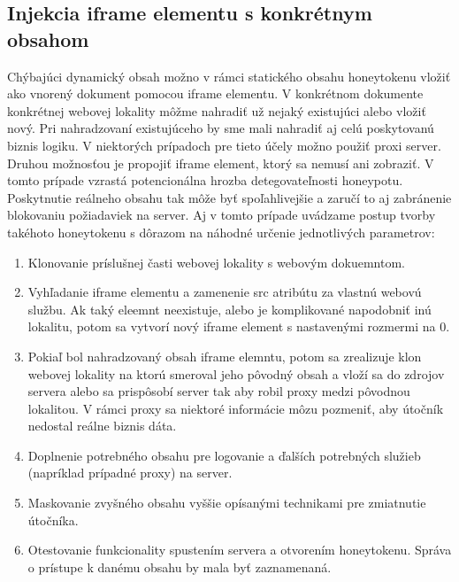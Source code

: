\documentclass[conference, 11pt,slovak,a4paper,twoside]{IEEEtran}
\begin{document}
\subsection{Injekcia iframe elementu s konkrétnym obsahom}

Chýbajúci dynamický obsah možno v rámci statického obsahu honeytokenu vložiť ako vnorený dokument pomocou iframe elementu. V konkrétnom dokumente konkrétnej webovej lokality môžme nahradiť už nejaký existujúci alebo vložiť nový. Pri nahradzovaní existujúceho by sme mali nahradiť aj celú poskytovanú biznis logiku. V niektorých prípadoch pre tieto účely možno použiť proxi server. Druhou možnosťou je propojiť iframe element, ktorý sa nemusí ani zobraziť. V tomto prípade vzrastá potencionálna hrozba detegovateľnosti honeypotu. Poskytnutie reálneho obsahu tak môže byť spoľahlivejšie a zaručí to aj zabránenie blokovaniu požiadaviek na server. Aj v tomto prípade uvádzame postup tvorby takéhoto honeytokenu s dôrazom na náhodné určenie jednotlivých parametrov:

\begin{enumerate}
	\item Klonovanie príslušnej časti webovej lokality s webovým dokuemntom.

	\item Vyhľadanie iframe elementu a zamenenie src atribútu za vlastnú webovú službu. Ak taký eleemnt neexistuje, alebo je komplikované napodobniť inú lokalitu, potom sa vytvorí nový iframe element s nastavenými rozmermi na 0.
	
	\item Pokiaľ bol nahradzovaný obsah iframe elemntu, potom sa zrealizuje klon webovej lokality na ktorú smeroval jeho pôvodný obsah a vloží sa do zdrojov servera alebo sa prispôsobí server tak aby robil proxy medzi pôvodnou lokalitou. V rámci proxy sa niektoré informácie môzu pozmeniť, aby útočník nedostal reálne biznis dáta.
	
	\item Doplnenie potrebného obsahu pre logovanie a ďalších potrebných služieb (napríklad prípadné proxy) na server.
	
	\item Maskovanie zvyšného obsahu vyššie opísanými technikami pre zmiatnutie útočníka.
	
	\item Otestovanie funkcionality spustením servera a otvorením honeytokenu. Správa o prístupe k danému obsahu by mala byť zaznamenaná.
\end{enumerate}
\end{document}
